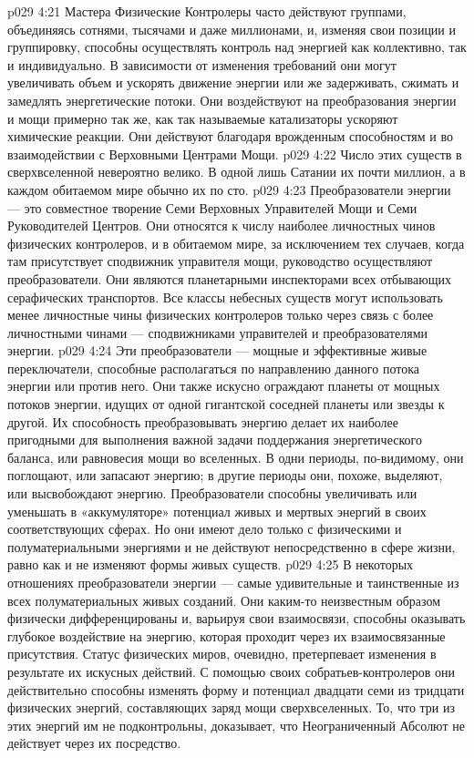 \vs p029 4:21 Мастера Физические Контролеры часто действуют группами, объединяясь сотнями, тысячами и даже миллионами, и, изменяя свои позиции и группировку, способны осуществлять контроль над энергией как коллективно, так и индивидуально. В зависимости от изменения требований они могут увеличивать объем и ускорять движение энергии или же задерживать, сжимать и замедлять энергетические потоки. Они воздействуют на преобразования энергии и мощи примерно так же, как так называемые катализаторы ускоряют химические реакции. Они действуют благодаря врожденным способностям и во взаимодействии с Верховными Центрами Мощи.
\vs p029 4:22 \pc {}\bibnobreakspace {} Число этих существ в сверхвселенной невероятно велико. В одной лишь Сатании их почти миллион, а в каждом обитаемом мире обычно их по сто.
\vs p029 4:23 Преобразователи энергии --- это совместное творение Семи Верховных Управителей Мощи и Семи Руководителей Центров. Они относятся к числу наиболее личностных чинов физических контролеров, и в обитаемом мире, за исключением тех случаев, когда там присутствует сподвижник управителя мощи, руководство осуществляют преобразователи. Они являются планетарными инспекторами всех отбывающих серафических транспортов. Все классы небесных существ могут использовать менее личностные чины физических контролеров только через связь с более личностными чинами --- сподвижниками управителей и преобразователями энергии.
\vs p029 4:24 Эти преобразователи --- мощные и эффективные живые переключатели, способные располагаться по направлению данного потока энергии или против него. Они также искусно ограждают планеты от мощных потоков энергии, идущих от одной гигантской соседней планеты или звезды к другой. Их способность преобразовывать энергию делает их наиболее пригодными для выполнения важной задачи поддержания энергетического баланса, или равновесия мощи во вселенных. В одни периоды, по\hyp{}видимому, они поглощают, или запасают энергию; в другие периоды они, похоже, выделяют, или высвобождают энергию. Преобразователи способны увеличивать или уменьшать в «аккумуляторе» потенциал живых и мертвых энергий в своих соответствующих сферах. Но они имеют дело только с физическими и полуматериальными энергиями и не действуют непосредственно в сфере жизни, равно как и не изменяют формы живых существ.
\vs p029 4:25 В некоторых отношениях преобразователи энергии --- самые удивительные и таинственные из всех полуматериальных живых созданий. Они каким\hyp{}то неизвестным образом физически дифференцированы и, варьируя свои взаимосвязи, способны оказывать глубокое воздействие на энергию, которая проходит через их взаимосвязанные присутствия. Статус физических миров, очевидно, претерпевает изменения в результате их искусных действий.  С помощью своих собратьев\hyp{}контролеров они действительно способны изменять форму и потенциал двадцати семи из тридцати физических энергий, составляющих заряд мощи сверхвселенных. То, что три из этих энергий им не подконтрольны, доказывает, что Неограниченный Абсолют не действует через их посредство.
